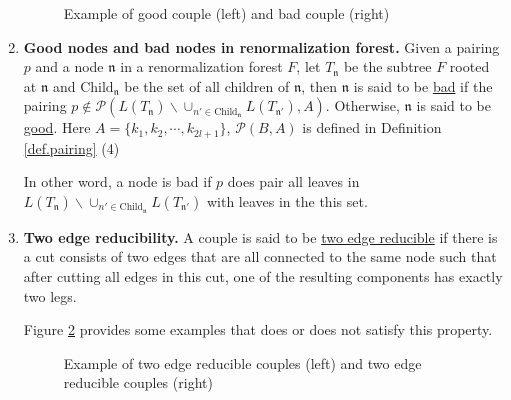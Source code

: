 \begin{defn}
\begin{enumerate}
\begin{figure}[H]
{\begin{tikzpicture}
            
        \end{tikzpicture}
        }
            \caption{Example of good couple (left) and bad couple (right)}
            \label{fig.goodbad}
        \end{figure}

        \item \textbf{Good nodes and bad nodes in renormalization forest.} Given a pairing $p$ and a node $\mathfrak{n}$ in a renormalization forest $F$, let $T_{\mathfrak{n}}$ be the subtree $F$ rooted at $\mathfrak{n}$ and $\text{Child}_{\mathfrak{n}}$ be the set of all children of $\mathfrak{n}$, then $\mathfrak{n}$ is said to be \underline{bad} if the pairing $p\notin \mathcal{P}(L(T_{\mathfrak{n}})\backslash\cup_{n'\in \text{Child}_{\mathfrak{n}}} L(T_{\mathfrak{n}'}),A)$. Otherwise, $\mathfrak{n}$ is said to be \underline{good}. Here $A=\{k_1,k_2,\cdots,k_{2l+1}\}$, $\mathcal{P}(B,A)$ is defined in Definition \ref{def.pairing} (4)
        
        In other word, a node is bad if $p$ does pair all leaves in $L(T_{\mathfrak{n}})\backslash\cup_{n'\in \text{Child}_{\mathfrak{n}}} L(T_{\mathfrak{n}'})$ with leaves in the this set.
        

        \item \textbf{Two edge reducibility.} A couple is said to be \underline{two edge reducible} if there is a cut consists of two edges that are all connected to the same node such that after cutting all edges in this cut, one of the resulting components has exactly two legs.

        Figure \ref{fig.reducibility} provides some examples that does or does not satisfy this property.
        
        \begin{figure}[H]
            \centering
            \caption{Example of two edge reducible couples (left) and two edge reducible couples (right)}
            \label{fig.reducibility}
        \end{figure}
    \end{enumerate}
\end{defn}

